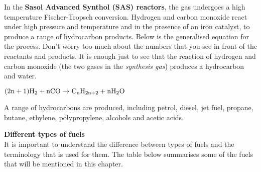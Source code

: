 \begin{enumerate}
In the \textbf{Sasol Advanced Synthol (SAS) reactors}, the gas undergoes a high temperature Fischer-Tropsch conversion. Hydrogen and carbon monoxide react under high pressure and temperature and in the presence of an iron catalyst, to produce a range of hydrocarbon products. Below is the generalised equation for the process. Don't worry too much about the numbers that you see in front of the reactants and products. It is enough just to see that the reaction of hydrogen and carbon monoxide (the two gases in the \textit{synthesis gas}) produces a hydrocarbon and water. 

\begin{center}
$\rm{(2n+1)H_{2} + nCO \rightarrow C_{n}H_{2n+2} + nH_{2}O}$\\
\end{center}

A range of hydrocarbons are produced, including petrol, diesel, jet fuel, propane, butane, ethylene, polypropylene, alcohols and acetic acids.


\textbf{Different types of fuels}\\

It is important to understand the difference between types of fuels and the terminology that is used for them. The table below summarises some of the fuels that will be mentioned in this chapter.\\


\end{enumerate}
